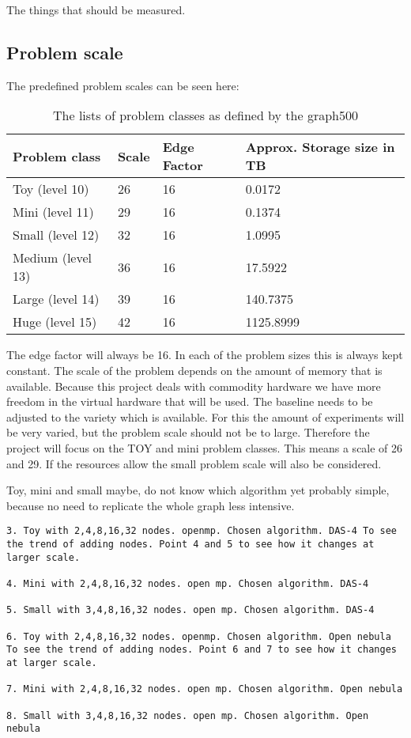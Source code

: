The things that should be measured.



\subsection{Problem scale}
The predefined problem scales can be seen here:
\begin{table}
\begin{tabular}{|l|l|l|l|}
\hline
Problem class & Scale & Edge Factor & Approx. Storage size in TB\\ \hline
Toy (level 10) &	26 &	16 &	0.0172\\ \hline
Mini (level 11) &	29 &	16 &	0.1374\\ \hline
Small (level 12) &	32 &	16 &	1.0995\\ \hline
Medium (level 13)& 	36 &	16 &	17.5922\\ \hline
Large (level 14) &	39 &	16 &	140.7375\\ \hline
Huge (level 15) &	42 &	16 &	1125.8999\\ \hline
\end{tabular}
\label{tab:problem_scales}
\caption{The lists of problem classes as defined by the graph500}
\end{table}



The edge factor will always be 16. In each of the problem sizes this is always kept constant.
The scale of the problem depends on the amount of memory that is available. Because this project deals with commodity hardware we have more freedom in the virtual hardware that will be used. The baseline needs to be adjusted to the variety which is available. For this the amount of experiments will be very varied, but the problem scale should not be to large. Therefore the project will focus on the TOY and mini problem classes. This means a scale of 26 and 29. If the resources allow the small problem scale will also be considered.

Toy, mini and small maybe, do not know which algorithm yet probably simple, because no need to replicate the whole graph less intensive.
\begin{lstlisting}
3. Toy with 2,4,8,16,32 nodes. openmp. Chosen algorithm. DAS-4 To see the trend of adding nodes. Point 4 and 5 to see how it changes at larger scale.

4. Mini with 2,4,8,16,32 nodes. open mp. Chosen algorithm. DAS-4

5. Small with 3,4,8,16,32 nodes. open mp. Chosen algorithm. DAS-4

6. Toy with 2,4,8,16,32 nodes. openmp. Chosen algorithm. Open nebula To see the trend of adding nodes. Point 6 and 7 to see how it changes at larger scale.

7. Mini with 2,4,8,16,32 nodes. open mp. Chosen algorithm. Open nebula

8. Small with 3,4,8,16,32 nodes. open mp. Chosen algorithm. Open nebula
\end{lstlisting}


